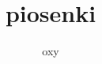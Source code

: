 \documentclass[a5paper,twoside]{songbook}
\title{piosenki}
\author{oxy}
\begin{document}
\maketitle




\renewcommand*\contentsname{Spis piosenek}
\tableofcontents
\end{document}

